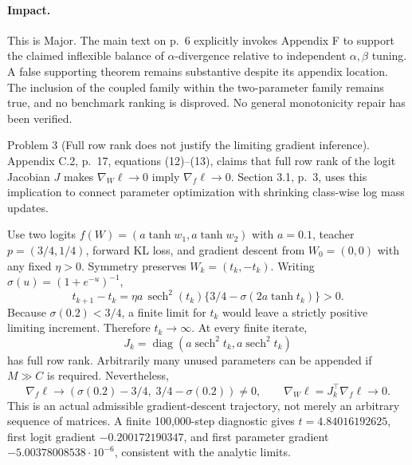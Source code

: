 \documentclass[10pt]{article}
\begin{document}
\paragraph*{Impact.}\mbox{}\par
This is Major. The main text on p. 6 explicitly invokes Appendix F to support the claimed inflexible balance of \(\alpha\)-divergence relative to independent \(\alpha,\beta\) tuning. A false supporting theorem remains substantive despite its appendix location. The inclusion of the coupled family within the two-parameter family remains true, and no benchmark ranking is disproved. No general monotonicity repair has been verified.\par
Problem 3 (Full row rank does not justify the limiting gradient inference).  Appendix C.2, p. 17, equations (12)–(13), claims that full row rank of the logit Jacobian \(J\) makes \(\nabla_W\ell\to0\) imply \(\nabla_f\ell\to0\). Section 3.1, p. 3, uses this implication to connect parameter optimization with shrinking class-wise log mass updates.\par
Use two logits \(f(W)=(a\tanh w_1,a\tanh w_2)\) with \(a=0.1\), teacher \(p=(3/4,1/4)\), forward KL loss, and gradient descent from \(W_0=(0,0)\) with any fixed \(\eta>0\). Symmetry preserves \(W_k=(t_k,-t_k)\). Writing \(\sigma(u)=(1+e^{-u})^{-1}\), \[t_{k+1}-t_k
=\eta a\,\operatorname{sech}^2(t_k)
 \{3/4-\sigma(2a\tanh t_k)\}>0.\] Because \(\sigma(0.2)<3/4\), a finite limit for \(t_k\) would leave a strictly positive limiting increment. Therefore \(t_k\to\infty\). At every finite iterate, \[J_k=\operatorname{diag}(a\operatorname{sech}^2t_k,
                       a\operatorname{sech}^2t_k)\] has full row rank. Arbitrarily many unused parameters can be appended if \(M\gg C\) is required. Nevertheless, \[\nabla_f\ell\longrightarrow
(\sigma(0.2)-3/4,\;3/4-\sigma(0.2))\ne0,\qquad
\nabla_W\ell=J_k^\top\nabla_f\ell\longrightarrow0.\] This is an actual admissible gradient-descent trajectory, not merely an arbitrary sequence of matrices. A finite 100,000-step diagnostic gives \(t=4.84016192625\), first logit gradient \(-0.200172190347\), and first parameter gradient \(-5.00378008538\cdot10^{-6}\), consistent with the analytic limits.\par
\end{document}
